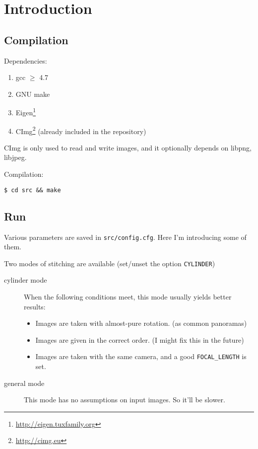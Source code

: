 \section{Introduction}
\subsection{Compilation}
Dependencies:

\begin{enumerate}
    \item gcc $ \ge$ 4.7
    \item GNU make
    \item Eigen\footnote{\url{http://eigen.tuxfamily.org}}
    \item CImg\footnote{\url{http://cimg.eu}} (already included in the repository)
    \end{enumerate}
    CImg is only used to read and write images, and it optionally depends
    on libpng, libjpeg.

Compilation:
\begin{lstlisting}
$ cd src && make
\end{lstlisting}

\subsection{Run}
Various parameters are saved in \verb|src/config.cfg|.
Here I'm introducing some of them.

Two modes of stitching are available (set/unset the option \verb|CYLINDER|)
\begin{description}
  \item[cylinder mode] When the following conditions meet, this mode usually yields better results:
\begin{itemize}
  \item Images are taken with almost-pure rotation. (as common panoramas)
	\item Images are given in the correct order. (I might fix this in the future)
  \item Images are taken with the same camera, and a good \verb|FOCAL_LENGTH| is set.
\end{itemize}

\item [general mode] This mode has no assumptions on input images. So it'll be slower.
\end{description}

